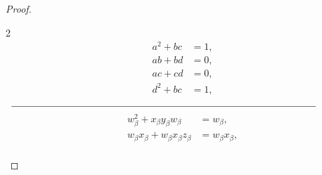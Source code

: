 \documentclass[preprint]{elsarticle}
\begin{document}
\begin{proof}
\begin{tcolorbox}[
  title=System of Equations for {\(\displaystyle \beta = 0,1,2,\dots,k-1, \alpha= 0,1,\dots,k-2 ~\& ~ \alpha < \beta \)},,
  colframe=black,
  colback=white,
  sharp corners,
  fonttitle=\bfseries,
]
\setlength{\columnseprule}{0.4pt}
\vspace{-0.6cm}
\begin{multicols}{2}
{
\begin{align*}
a^2 + bc &= 1,\\
ab + bd &= 0,\\
ac + cd &= 0,\\
d^2 + bc &= 1,
\end{align*}
\vspace{-0.2cm}}
$\begin{array}{c}
\rule{.9\linewidth}{0.4pt}
\end{array}$
{
\begin{align*}
w_{\beta}^2 + x_{\beta} y_{\beta} w_{\beta} &= w_{\beta},\\
w_{\beta} x_{\beta} + w_{\beta} x_{\beta} z_{\beta} &= w_{\beta} x_{\beta},\\

\end{align*}}
\end{multicols}
\end{tcolorbox}
\end{proof}
\end{document}
